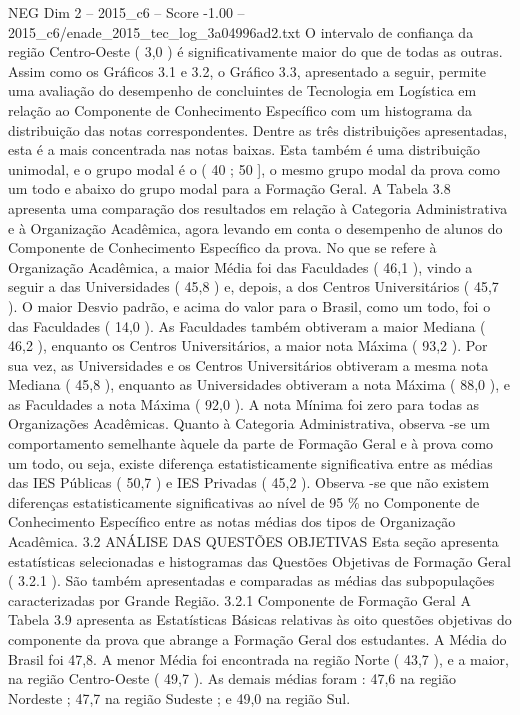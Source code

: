 \begin{textsample}{NEG Dim 2 – 2015\_c6 – Score -1.00 – 2015\_c6/enade\_2015\_tec\_log\_3a04996ad2.txt}
O intervalo de confiança da região Centro-Oeste ( 3,0 ) é significativamente maior do que de todas as outras.
Assim como os Gráficos 3.1 e 3.2, o Gráfico 3.3, apresentado a seguir, permite uma avaliação do desempenho de concluintes de Tecnologia em Logística em relação ao Componente de Conhecimento Específico com um histograma da distribuição das notas correspondentes.
Dentre as três distribuições apresentadas, esta é a mais concentrada nas notas baixas.
Esta também é uma distribuição unimodal, e o grupo modal é o ( 40 ; 50 ], o mesmo grupo modal da prova como um todo e abaixo do grupo modal para a Formação Geral.
A Tabela 3.8 apresenta uma comparação dos resultados em relação à Categoria Administrativa e à Organização Acadêmica, agora levando em conta o desempenho de alunos do Componente de Conhecimento Específico da prova.
No que se refere à Organização Acadêmica, a maior Média foi das Faculdades ( 46,1 ), vindo a seguir a das Universidades ( 45,8 ) e, depois, a dos Centros Universitários ( 45,7 ).
O maior Desvio padrão, e acima do valor para o Brasil, como um todo, foi o das Faculdades ( 14,0 ).
As Faculdades também obtiveram a maior Mediana ( 46,2 ), enquanto os Centros Universitários, a maior nota Máxima ( 93,2 ).
Por sua vez, as Universidades e os Centros Universitários obtiveram a mesma nota Mediana ( 45,8 ), enquanto as Universidades obtiveram a nota Máxima ( 88,0 ), e as Faculdades a nota Máxima ( 92,0 ).
A nota Mínima foi zero para todas as Organizações Acadêmicas.
Quanto à Categoria Administrativa, observa -se um comportamento semelhante àquele da parte de Formação Geral e à prova como um todo, ou seja, existe diferença estatisticamente significativa entre as médias das IES Públicas ( 50,7 ) e IES Privadas ( 45,2 ).
Observa -se que não existem diferenças estatisticamente significativas ao nível de 95 \% no Componente de Conhecimento Específico entre as notas médias dos tipos de Organização Acadêmica. 3.2 ANÁLISE DAS QUESTÕES OBJETIVAS Esta seção apresenta estatísticas selecionadas e histogramas das Questões Objetivas de Formação Geral ( 3.2.1 ).
São também apresentadas e comparadas as médias das subpopulações caracterizadas por Grande Região. 3.2.1 Componente de Formação Geral A Tabela 3.9 apresenta as Estatísticas Básicas relativas às oito questões objetivas do componente da prova que abrange a Formação Geral dos estudantes.
A Média do Brasil foi 47,8.
A menor Média foi encontrada na região Norte ( 43,7 ), e a maior, na região Centro-Oeste ( 49,7 ).
As demais médias foram : 47,6 na região Nordeste ; 47,7 na região Sudeste ; e 49,0 na região Sul.

\end{textsample}
